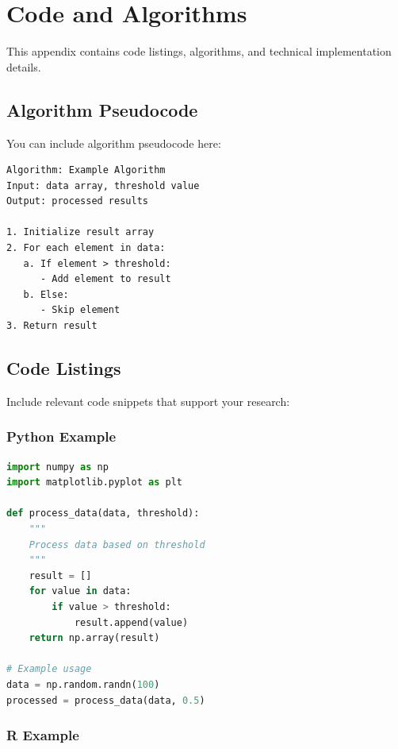 
\chapter{Code and Algorithms}
\label{appendix_b}


This appendix contains code listings, algorithms, and technical implementation details.

\section{Algorithm Pseudocode}

You can include algorithm pseudocode here:

\begin{verbatim}
Algorithm: Example Algorithm
Input: data array, threshold value
Output: processed results

1. Initialize result array
2. For each element in data:
   a. If element > threshold:
      - Add element to result
   b. Else:
      - Skip element
3. Return result
\end{verbatim}

\section{Code Listings}

Include relevant code snippets that support your research:

\subsection{Python Example}

\begin{lstlisting}[language=Python, caption=Example Python code]
import numpy as np
import matplotlib.pyplot as plt

def process_data(data, threshold):
    """
    Process data based on threshold
    """
    result = []
    for value in data:
        if value > threshold:
            result.append(value)
    return np.array(result)

# Example usage
data = np.random.randn(100)
processed = process_data(data, 0.5)
\end{lstlisting}

\subsection{R Example}

